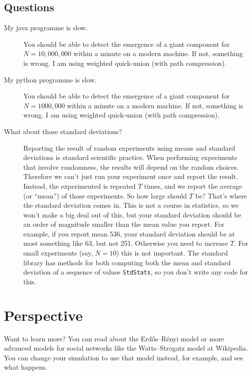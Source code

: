 \documentclass{tufte-handout}
\begin{document}
\subsection{Questions}
\begin{description}
\item[My java programme is slow.] You should be able to detect the emergence
  of a giant component for $N=10,000,000$ within a minute on a modern
  machine.
  If not, something is wrong.
  I am using weighted quick-union (with path compression).
\item[My python programme is slow.] You should be able to detect the emergence
  of a giant component for $N=1000,000$ within a minute on a modern
  machine.
  If not, something is wrong.
  I am using weighted quick-union (with path compression).
\item[What about those standard deviations?]
	Reporting the result of random experiments using means and standard deviations is standard scientific practice.
  When performing experiments that involve randomness,
  the results will depend on the random choices.
  Therefore we can't just run your experiment once and report the result.
  Instead, the experimented is repeated $T$ times, and we report the average
  (or ``mean'') of those experiments.
  So how large should $T$ be?
  That's where the standard deviation comes in.
  This is not a course in statistics, so we won't make a big deal out
  of this, but your standard deviation should be an order of magnitude
  smaller than the mean value you report.
  For example, if you report mean 536, your standard deviation should
  be at most something like 63, but not 251.
  Otherwise you need to increase $T$.
  For small experiments (say, $N=10$) this is not important.
  The standard library has methods for both computing both the mean and standard
  deviation of a sequence of values {\tt StdStats}, so you don't write any code for this.
\end{description}

\section{Perspective}

Want to learn more?
You can read about the Erd\H{o}s--R\'enyi model or more advanced models for social networks like the Watts--Strogatz model at Wikipedia.
You can change your simulation to use that model instead, for example, and see what happens.
\end{document}
